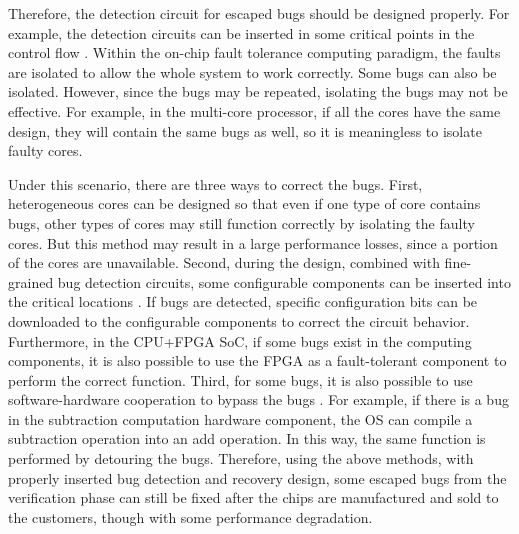 Therefore, the detection circuit for escaped bugs should be designed properly. For example, the detection circuits can be inserted in some critical points in the control flow \cite{gizopoulos2011architectures}. Within the on-chip fault tolerance computing paradigm, the faults are isolated to allow the whole system to work correctly. Some bugs can also be isolated. However, since the bugs may be repeated, isolating the bugs may not be effective. For example, in the multi-core processor, if all the cores have the same design, they will contain the same bugs as well, so it is meaningless to isolate faulty cores. 

Under this scenario, there are three ways to correct the bugs. First, heterogeneous cores can be designed so that even if one type of core contains bugs, other types of cores may still function correctly by isolating the faulty cores. But this method may result in a large performance losses, since a portion of the cores are unavailable. Second, during the design, combined with fine-grained bug detection circuits, some configurable components can be inserted into the critical locations \cite{alizadeh2010debugging}. If bugs are detected, specific configuration bits can be downloaded to the configurable components to correct the circuit behavior. Furthermore, in the CPU+FPGA SoC, if some bugs exist in the computing components, it is also possible to use the FPGA as a fault-tolerant component to perform the correct function. Third, for some bugs, it is also possible to use software-hardware cooperation to bypass the bugs \cite{chang2011constraint}. For example, if there is a bug in the subtraction computation hardware component, the OS can compile a subtraction operation into an add operation. In this way, the same function is performed by detouring the bugs. Therefore, using the above methods, with properly inserted bug detection and recovery design, some escaped bugs from the verification phase can still be fixed after the chips are manufactured and sold to the customers, though with some performance degradation.

